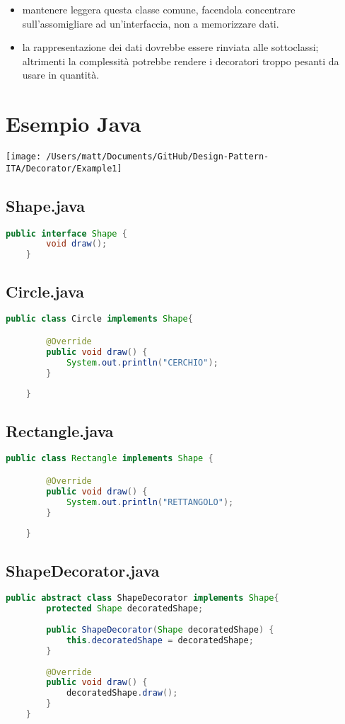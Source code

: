 \begin{itemize}
    \item mantenere leggera questa classe comune, facendola concentrare sull'assomigliare ad un'interfaccia, non a memorizzare dati.

    \item la rappresentazione dei dati dovrebbe essere rinviata alle sottoclassi; altrimenti la complessità potrebbe rendere i decoratori troppo pesanti da usare in quantità.
\end{itemize}


\section{Esempio Java}
\texttt{[image: /Users/matt/Documents/GitHub/Design-Pattern-ITA/Decorator/Example1]}

\subsection{Shape.java}
\begin{lstlisting}[language=java]
    public interface Shape {
        void draw();
    }
\end{lstlisting}

\subsection{Circle.java}
\begin{lstlisting}[language=java]
    public class Circle implements Shape{

        @Override
        public void draw() {
            System.out.println("CERCHIO");
        }
        
    }
\end{lstlisting}

\subsection{Rectangle.java}
\begin{lstlisting}[language=java]
    public class Rectangle implements Shape {

        @Override
        public void draw() {
            System.out.println("RETTANGOLO");
        }
        
    }
\end{lstlisting}

\subsection{ShapeDecorator.java}
\begin{lstlisting}[language=java]
    public abstract class ShapeDecorator implements Shape{
        protected Shape decoratedShape;
    
        public ShapeDecorator(Shape decoratedShape) {
            this.decoratedShape = decoratedShape;
        }
    
        @Override
        public void draw() {
            decoratedShape.draw();
        }
    }
\end{lstlisting}

